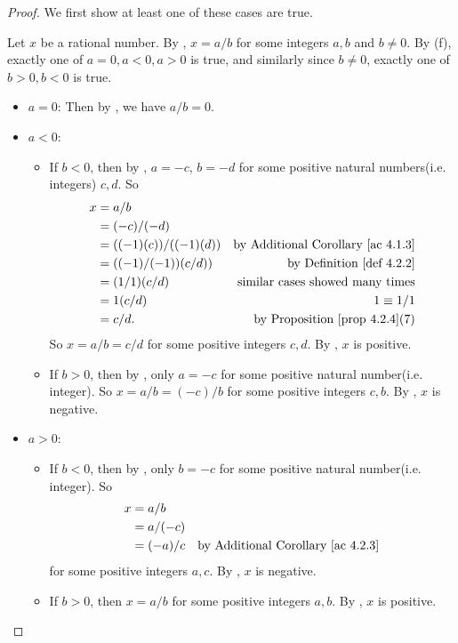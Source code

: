 \begin{proof}
We first show at least one of these cases are true.

Let \(x\) be a rational number.
By , \(x = a / b\) for some integers \(a, b\) and \(b \neq 0\).
By (f), exactly one of \(a = 0, a < 0, a > 0\) is true, and similarly since \(b \neq 0\), exactly one of \(b > 0, b < 0\) is true.
\begin{itemize}
    \item \(a = 0\):
        Then by , we have \(a / b = 0\).
    \item \(a < 0\):
        \begin{itemize}
            \item
                If \(b < 0\), then by , \(a = -c\), \(b = -d\) for some positive natural numbers(i.e. integers) \(c, d\).
                So
                \begin{align*}
                    x & = a / b \\
                      & = (-c)/(-d) \\
                      & = ((-1)(c))/((-1)(d)) & \text{by \AC{4.1.3}} \\
                      & = ((-1)/(-1))(c/d)) & \text{by \DEF{4.2.2}} \\
                      & = (1/1)(c/d) & \text{similar cases showed many times} \\
                      & = 1(c/d) & \text{\(1 \equiv 1 / 1\)} \\
                      & = c/d. & \text{by \PROP{4.2.4}(7)} \\
                \end{align*}
                So \(x = a/ b = c/d\) for some positive integers \(c, d\).
                By , \(x\) is positive.
            \item 
                If \(b > 0\), then by , only \(a = -c\) for some positive natural number(i.e. integer).
                So \(x = a / b = (-c) / b\) for some positive integers \(c, b\).
                By , \(x\) is negative.
        \end{itemize}
    \item \(a > 0\):
        \begin{itemize}
            \item 
                If \(b < 0\), then by , only \(b = -c\) for some positive natural number(i.e. integer).
                So
                \begin{align*}
                    x & = a / b \\
                      & = a / (-c) \\
                      & = (-a)/c & \text{by \AC{4.2.3}} \\
                \end{align*} for some positive integers \(a, c\).
                By , \(x\) is negative.
            \item 
                If \(b > 0\), then \(x = a/b\) for some positive integers \(a, b\). By , \(x\) is positive.
        \end{itemize}
\end{itemize}


\end{proof}
